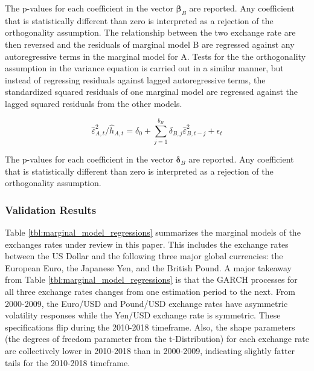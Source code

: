 The p-values for each coefficient in the vector $\boldsymbol{\beta}_{B}$ are reported. Any coefficient that is statistically different than zero is interpreted as a rejection of the orthogonality assumption. The relationship between the two exchange rate are then reversed and the residuals of marginal model B are regressed against any autoregressive terms in the marginal model for A. Tests for the the orthogonality assumption in the variance equation is carried out in a similar manner, but instead of regressing residuals against lagged autoregressive terms, the standardized squared residuals of one marginal model are regressed against the lagged squared residuals from the other models.

\begin{equation}  \label{eq:var_orthogonality_assumption}
	\hat{\varepsilon}_{A,t}^{2} / \hat{h}_{A,t} = \delta_{0} + \sum_{j=1}^{b_{B}}\delta_{B,j} \hat{\varepsilon}^{2}_{B, t-j} + \epsilon_{t}
\end{equation}

The p-values for each coefficient in the vector $\boldsymbol{\delta}_{B}$ are reported. Any coefficient that is statistically different than zero is interpreted as a rejection of the orthogonality assumption.

\subsubsection{Validation Results}

Table \ref{tbl:marginal_model_regressions} summarizes the marginal models of the exchanges rates under review in this paper. This includes the exchange rates between the US Dollar and the following three major global currencies: the European Euro, the Japanese Yen, and the British Pound. A major takeaway from Table \ref{tbl:marginal_model_regressions} is that the GARCH processes for all three exchange rates changes from one estimation period to the next. From 2000-2009, the Euro/USD and Pound/USD exchange rates have asymmetric volatility responses while the Yen/USD exchange rate is symmetric. These specifications flip during the 2010-2018 timeframe. Also, the shape parameters (the degrees of freedom parameter from the t-Distribution) for each exchange rate are collectively lower in 2010-2018 than in 2000-2009, indicating slightly fatter tails for the 2010-2018 timeframe.

